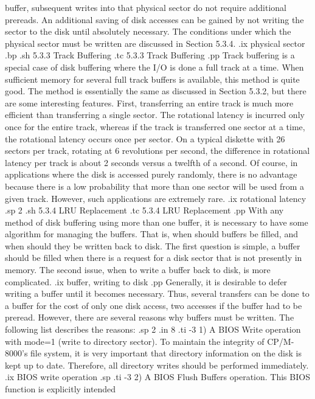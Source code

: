 buffer, subsequent writes into that physical sector do not require additional 
prereads.  An additional saving of disk accesses can be gained by not 
writing the sector to the disk until absolutely necessary.  The conditions 
under which the physical sector must be written are discussed in 
Section 5.3.4.
.ix physical sector
.bp
.sh
5.3.3  Track Buffering
.tc         5.3.3  Track Buffering
.pp
Track buffering is a special case of disk buffering where the I/O is done
a full track at a time.  When sufficient memory for several full track
buffers is available, this method is quite good.  The method is essentially
the same as discussed in Section 5.3.2, but there are some interesting
features.  First, transferring an entire track is much more efficient than
transferring a single sector.  The rotational latency is incurred only once
for the entire track, whereas if the track is transferred one sector at a
time, the rotational latency occurs once per sector.  On a typical diskette
with 26 sectors per track, rotating at 6 revolutions per second, the difference
in rotational latency per track is about 2 seconds versus a twelfth of a 
second.  Of course, in applications where the disk is accessed purely 
randomly, there is no advantage because there is a low probability that
more than one sector will be used from a given track.  However, such 
applications are extremely rare.
.ix rotational latency
.sp 2
.sh
5.3.4  LRU Replacement
.tc         5.3.4  LRU Replacement
.pp
With any method of disk buffering using more than one buffer, it is necessary
to have some algorithm for managing the buffers.  That is, when should buffers
be filled, and when should they be written back to disk.  The first question
is simple, a buffer should be filled when there is a request for a disk sector
that is not presently in memory.  The second issue, when to write a buffer
back to disk, is more complicated.  
.ix buffer, writing to disk
.pp
Generally, it is desirable to defer writing a buffer until it becomes 
necessary.  Thus, several transfers can be done to a buffer for the cost of
only one disk access, two accesses if the buffer had to be preread.  
However, there are several reasons why buffers must be written.  The following 
list describes the reasons:
.sp 2
.in 8
.ti -3
1) A BIOS Write operation with mode=1 (write to directory sector).  To maintain
the integrity of CP/M-8000's file system, it is very important that directory
information on the disk is kept up to date.  Therefore, all directory writes
should be performed immediately.
.ix BIOS write operation
.sp
.ti -3
2) A BIOS Flush Buffers operation.  This BIOS function is explicitly intended

